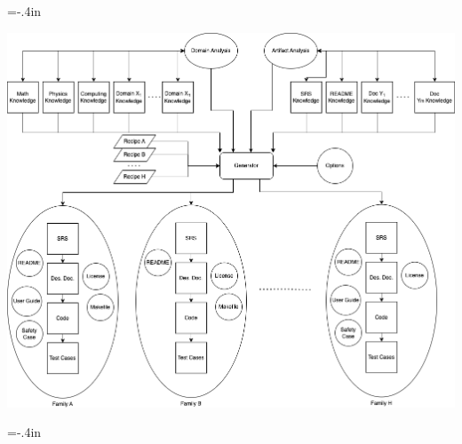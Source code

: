 \documentclass[usenames]{beamer}
\begin{document}
\hoffset=-.4in
\begin{frame}


\includegraphics[width=1.05\textwidth]{../figures/GenAllThings.png}

\end{frame}
\hoffset=0in 
\hoffset=-.4in
\end{document}
